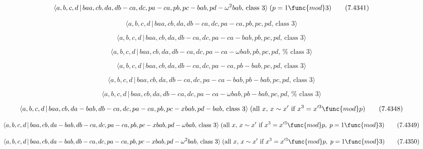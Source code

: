 \documentclass[10pt]{article}
\begin{document}
\begin{equation}
\langle a,b,c,d\,|\,baa,cb,da,db-ca,dc,pa-ca,pb,pc-bab,pd-\omega ^{2}bab,\,%
\text{class }3\rangle \;(p=1\func{mod}3)  \tag{7.4341}
\end{equation}

\begin{equation}
\langle a,b,c,d\,|\,baa,cb,da,db-ca,dc,pa-ca,pb,pc,pd,\,\text{class }3\rangle
\tag{7.4342}
\end{equation}

\begin{equation}
\langle a,b,c,d\,|\,baa,cb,da,db-ca,dc,pa-ca-bab,pb,pc,pd,\,\text{class }%
3\rangle  \tag{7.4343}
\end{equation}

\begin{equation}
\langle a,b,c,d\,|\,baa,cb,da,db-ca,dc,pa-ca-\omega bab,pb,pc,pd,\,\text{%
class }3\rangle  \tag{7.4344}
\end{equation}

\begin{equation}
\langle a,b,c,d\,|\,baa,cb,da,db-ca,dc,pa-ca,pb-bab,pc,pd,\,\text{class }%
3\rangle  \tag{7.4345}
\end{equation}

\begin{equation}
\langle a,b,c,d\,|\,baa,cb,da,db-ca,dc,pa-ca-bab,pb-bab,pc,pd,\,\text{class }%
3\rangle  \tag{7.4346}
\end{equation}

\begin{equation}
\langle a,b,c,d\,|\,baa,cb,da,db-ca,dc,pa-ca-\omega bab,pb-bab,pc,pd,\,\text{%
class }3\rangle  \tag{7.4347}
\end{equation}

\begin{equation}
\langle a,b,c,d\,|\,baa,cb,da-bab,db-ca,dc,pa-ca,pb,pc-xbab,pd-bab,\,\text{%
class }3\rangle \;(\text{all }x,\,x \sim x^{\prime }\text{ if }x^3=x^{\prime
3}\func{mod}p)  \tag{7.4348}
\end{equation}

\begin{equation}
\langle a,b,c,d\,|\,baa,cb,da-bab,db-ca,dc,pa-ca,pb,pc-xbab,pd-\omega bab,\,%
\text{class }3\rangle \;(\text{all }x,\,x \sim x^{\prime }\text{ if }%
x^3=x^{\prime 3}\func{mod}p,\;p=1\func{mod}3)  \tag{7.4349}
\end{equation}

\begin{equation}
\langle a,b,c,d\,|\,baa,cb,da-bab,db-ca,dc,pa-ca,pb,pc-xbab,pd-\omega
^{2}bab,\,\text{class }3\rangle \;(\text{all }x,\,x\sim x^{\prime}\text{ if }%
x^3 =x^{\prime 3}\func{mod}p,\;p=1\func{mod}3)  \tag{7.4350}
\end{equation}
\end{document}
